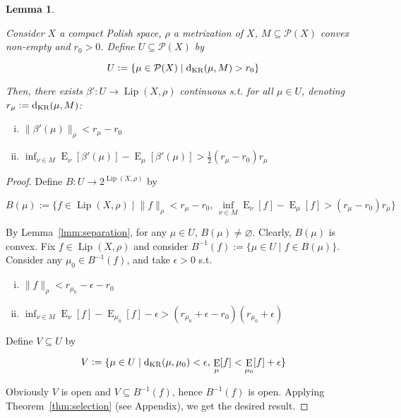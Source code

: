 \documentclass[11pt]{article}
\theoremstyle{definition}
\theoremstyle{plain}
\newtheorem{lemma}{Lemma}%
\newcommand{\N}[1]{\lVert #1 \rVert}
\DeclareMathOperator{\E}{E}
\newcommand{\PM}{\mathcal{P}}
\newcommand{\Lp}{{\operatorname{Lip}}}
\newcommand{\DKR}{\operatorname{d}_{\textnormal{KR}}}
\begin{document}
\begin{samepage}
\begin{lemma}
\label{lmm:savvy_outside}

Consider $X$ a compact Polish space, $\rho$ a metrization of $X$, $M \subseteq \PM(X)$ convex non-empty and $r_0 > 0$. Define $U \subseteq \PM(X)$ by

\begin{equation*}
U := \{\mu \in \PM(X) \mid \DKR(\mu,M) > r_0\}
\end{equation*}

Then, there exists $\beta': U \rightarrow \Lp(X,\rho)$ continuous s.t. for all $\mu \in U$, denoting $r_\mu:=\DKR(\mu,M)$:

\begin{enumerate}[i.]

\item $\N{\beta'(\mu)}_\rho < r_\mu - r_0$
\item $\inf_{\nu \in M} \E_\nu[\beta'(\mu)] - \E_\mu[\beta'(\mu)] > \frac{1}{2} (r_\mu - r_0) r_\mu$

\end{enumerate}

\end{lemma}
\end{samepage}

\begin{proof}

Define $B: U \rightarrow 2^{\Lp(X,\rho)}$ by

$$B(\mu):=\{f \in \Lp(X,\rho) \mid \N{f}_\rho < r_\mu - r_0,\, \inf_{\nu \in M} \E_\nu[f] - \E_\mu[f] > (r_\mu - r_0) r_\mu\}$$

By Lemma~\ref{lmm:separation}, for any $\mu \in U$, $B(\mu) \ne \varnothing$. Clearly, $B(\mu)$ is convex. Fix $f \in \Lp(X,\rho)$ and consider $B^{-1}(f):=\{\mu \in U \mid f \in B(\mu)\}$. Consider any $\mu_0 \in B^{-1}(f)$, and take $\epsilon > 0$ s.t.

\begin{enumerate}[i.]

\item $\N{f}_\rho < r_{\mu_0}  - \epsilon - r_0$
\item $\inf_{\nu \in M} \E_\nu[f] - \E_{\mu_0}[f] -\epsilon > (r_{\mu_0} + \epsilon  - r_0) (r_{\mu_0} + \epsilon)$

\end{enumerate}

Define $V \subseteq U$ by 

$$V := \{\mu \in U \mid \DKR(\mu,\mu_0) < \epsilon,\, \E_\mu[f] < \E_{\mu_0}[f] + \epsilon\}$$

Obviously $V$ is open and $V \subseteq B^{-1}(f)$, hence $B^{-1}(f)$ is open. Applying Theorem~\ref{thm:selection} (see Appendix), we get the desired result.
\end{proof}
\end{document}
